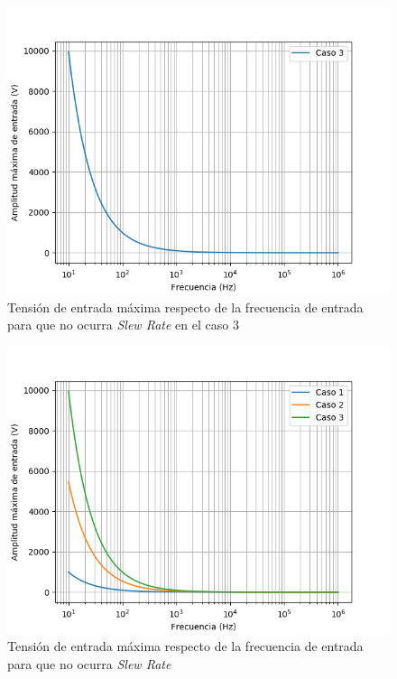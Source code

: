 \begin{figure}[H]
\begin{centering}
\includegraphics[scale=0.5]{../Ex1/iB/Resources1b/slewRate3}
\par\end{centering}
\caption{Tensión de entrada máxima respecto de la frecuencia de entrada para
que no ocurra \emph{Slew Rate} en el caso 3}
\label{1_b_25}
\end{figure}

\begin{figure}[H]
\begin{centering}
\includegraphics[scale=0.5]{../Ex1/iB/Resources1b/slewRate123}
\par\end{centering}
\caption{Tensión de entrada máxima respecto de la frecuencia de entrada para
que no ocurra \emph{Slew Rate}}
\label{1_b_26}
\end{figure}

